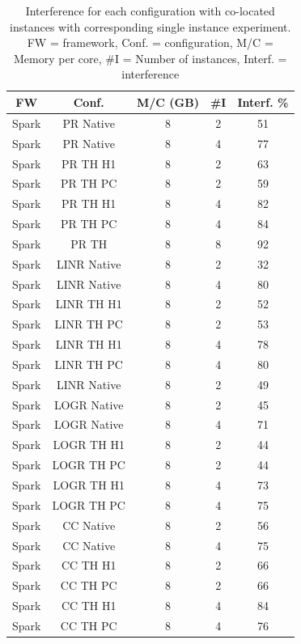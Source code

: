 \begin{table}[thbp]
  \centering
  \caption{Interference for each configuration with co-located instances with corresponding single instance experiment.
	FW = framework, Conf. = configuration, M/C = Memory per core, #I = Number of instances, Interf. = interference }
  \label{tab:interference}
  \begin{tabular}{|c|c|c|c|c|}
    \hline
	  \textbf{FW} & \textbf{Conf.} & \textbf{M/C (GB)} & \textbf{\#I} & \textbf{Interf. \%} \\
    \hline
	  Spark & PR Native & 8 & 2 & 51 \\
	  Spark & PR Native & 8 & 4 & 77 \\
	  Spark & PR TH H1 & 8 & 2 &  63 \\
	  Spark & PR TH PC & 8 & 2 & 59 \\
	  Spark & PR TH H1 & 8 & 4 &  82 \\
	  Spark & PR TH PC & 8 & 4 & 84 \\
	  Spark & PR TH & 8 & 8 & 92 \\
	  Spark & LINR Native & 8 & 2 & 32  \\
	  Spark & LINR Native & 8 & 4 & 80 \\
	  Spark & LINR TH H1 & 8 & 2 & 52 \\
	  Spark & LINR TH PC & 8 & 2 & 53 \\
	  Spark & LINR TH H1 & 8 & 4 & 78 \\
	  Spark & LINR TH PC & 8 & 4 & 80 \\
	  Spark & LINR Native & 8 & 2 & 49 \\
	  Spark & LOGR Native & 8 & 2 & 45 \\
	  Spark & LOGR Native & 8 & 4 & 71 \\
	  Spark & LOGR TH H1 & 8 & 2 & 44 \\
	  Spark & LOGR TH PC & 8 & 2 & 44 \\
	  Spark & LOGR TH H1 & 8 & 4 & 73 \\
	  Spark & LOGR TH PC & 8 & 4 & 75 \\
          Spark & CC Native & 8 & 2 & 56 \\
          Spark & CC Native & 8 & 4 & 75 \\
          Spark & CC TH H1 & 8 & 2 & 66 \\
          Spark & CC TH PC & 8 & 2 & 66 \\
          Spark & CC TH H1 & 8 & 4 & 84  \\
          Spark & CC TH PC & 8 & 4 & 76 \\

\end{tabular}
\end{table}
